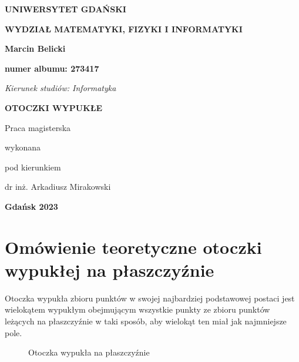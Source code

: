     \thispagestyle{empty}
    \begin{adjustwidth}{-1cm}{0cm}
    \begin{center}
    		\begin{large}
\textbf{UNIWERSYTET GDAŃSKI}

\vspace{.2 cm}
\textbf{WYDZIAŁ MATEMATYKI, FIZYKI I INFORMATYKI}
\end{large}

\vspace{3 cm}
\textbf{Marcin Belicki}

\textbf{numer albumu: 273417}
    \end{center}
    
\vspace{3 cm}
\textit{Kierunek studiów: Informatyka}

\vspace{3 cm}
\begin{center}
	\begin{large}
		\textbf{OTOCZKI WYPUKŁE}
	\end{large}
\end{center}

\vspace{3 cm}
\begin{flushright}
Praca magisterska

wykonana

pod kierunkiem

dr inż. Arkadiusz Mirakowski
\end{flushright}
\vspace{2 cm}
\begin{center}
\textbf{Gdańsk 2023}
\end{center}

    \end{adjustwidth}
    
    \tableofcontents	

  

    \chapter{Omówienie teoretyczne otoczki wypukłej na płaszczyźnie}
    \cite{article}

    Otoczka wypukła zbioru punktów w swojej najbardziej podstawowej postaci jest wielokątem wypukłym obejmującym wszystkie punkty ze zbioru punktów leżących na płaszczyźnie w taki sposób, aby wielokąt ten miał jak najmniejsze pole.    
    \begin{figure}[h!]
        	\begin{center}
    			
    			\caption{Otoczka wypukła na płaszczyźnie\mysrc}\label{fig:example_hull}
    	\end{center}
    	\vspace{-0.8cm}
    \end{figure}
    
